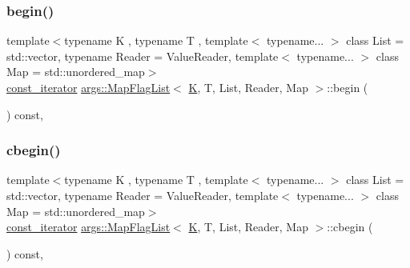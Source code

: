 \mbox{\label{classargs_1_1_map_flag_list_a8592b905d9930af771a904ddd02f185f}} 
\subsubsection{\texorpdfstring{begin()}{begin()}\hspace{0.1cm}{\footnotesize\ttfamily [2/2]}}
{\footnotesize\ttfamily template$<$typename K , typename T , template$<$ typename... $>$ class List = std\+::vector, typename Reader  = Value\+Reader, template$<$ typename... $>$ class Map = std\+::unordered\+\_\+map$>$ \\
\hyperlink{classargs_1_1_map_flag_list_a6b59eb2e45bf0e576d01b902f3c7a0d7}{const\+\_\+iterator} \hyperlink{classargs_1_1_map_flag_list}{args\+::\+Map\+Flag\+List}$<$ \hyperlink{cgal__test_8cpp_a891e241aa245ae63618f03737efba309}{K}, T, List, Reader, Map $>$\+::begin (\begin{DoxyParamCaption}{ }\end{DoxyParamCaption}) const\hspace{0.3cm}{\ttfamily [inline]}, {\ttfamily [noexcept]}}

\mbox{\label{classargs_1_1_map_flag_list_ae2a91b86b914cfcb9bdf1d855d50f7e2}} 
\subsubsection{\texorpdfstring{cbegin()}{cbegin()}}
{\footnotesize\ttfamily template$<$typename K , typename T , template$<$ typename... $>$ class List = std\+::vector, typename Reader  = Value\+Reader, template$<$ typename... $>$ class Map = std\+::unordered\+\_\+map$>$ \\
\hyperlink{classargs_1_1_map_flag_list_a6b59eb2e45bf0e576d01b902f3c7a0d7}{const\+\_\+iterator} \hyperlink{classargs_1_1_map_flag_list}{args\+::\+Map\+Flag\+List}$<$ \hyperlink{cgal__test_8cpp_a891e241aa245ae63618f03737efba309}{K}, T, List, Reader, Map $>$\+::cbegin (\begin{DoxyParamCaption}{ }\end{DoxyParamCaption}) const\hspace{0.3cm}{\ttfamily [inline]}, {\ttfamily [noexcept]}}

